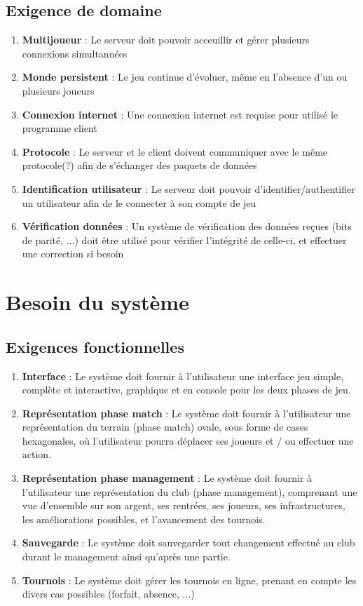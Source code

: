\documentclass[a4paper]{article}
\begin{document}
\subsection{Exigence de domaine}
\begin{enumerate}
\item \textbf{Multijoueur} : Le serveur doit pouvoir acceuillir et gérer plusieurs connexions simultannées
\item \textbf{Monde persistent} : Le jeu continue d'évoluer, même en l'absence d'un ou plusieurs joueurs
\item \textbf{Connexion internet} : Une connexion internet est requise pour utilisé le programme client
\item \textbf{Protocole} : Le serveur et le client doivent communiquer avec le même protocole(?) afin de s'échanger des paquets de données
\item \textbf{Identification utilisateur} : Le serveur doit pouvoir d'identifier/authentifier un utilisateur afin de le connecter à son compte de jeu
\item \textbf{Vérification données} : Un système de vérification des données reçues (bits de parité, ...) doit être utilisé pour vérifier l'intégrité de celle-ci, et effectuer une correction si besoin
\end{enumerate}
\section{Besoin du système}
\subsection{Exigences fonctionnelles}

\begin{enumerate}
\item \textbf{Interface} : Le système doit fournir à l'utilisateur une interface jeu simple, complète et interactive, graphique et en console pour les deux phases de jeu.
\item \textbf{Représentation phase match} : Le système doit fournir à l'utilisateur une représentation du terrain (phase match) ovale, sous forme de cases hexagonales, où l'utilisateur pourra déplacer ses joueurs et / ou effectuer une action.
\item \textbf{Représentation phase management} : Le système doit fournir à l'utilisateur une représentation du club (phase management), comprenant une vue d'ensemble sur son argent, ses rentrées, ses joueurs, ses infrastructures, les améliorations possibles, et l'avancement des tournois.
\item \textbf{Sauvegarde} : Le système doit sauvegarder tout changement effectué au club durant le management ainsi qu'après une partie.
\item \textbf{Tournois} : Le système doit gérer les tournois en ligne, prenant en compte les divers cas possibles (forfait, absence, ...)
\end{enumerate}
\end{document}
